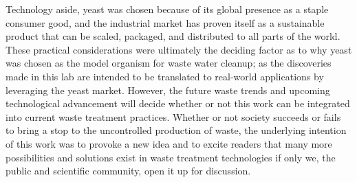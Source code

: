 \documentclass[../main/main]{subfiles}
\begin{document}
Technology aside, yeast was chosen because of its global presence as a staple consumer good, and the industrial market has proven itself as a sustainable product that can be scaled, packaged, and distributed to all parts of the world. These practical considerations were ultimately the deciding factor as to why yeast was chosen as the model organism for waste water cleanup; as the discoveries made in this lab are intended to be translated to real-world applications by leveraging the yeast market. However, the future waste trends and upcoming technological advancement will decide whether or not this work can be integrated into current waste treatment practices. Whether or not society succeeds or fails to bring a stop to the uncontrolled production of waste, the underlying intention of this work was to provoke a new idea and to excite readers that many more possibilities and solutions exist in waste treatment technologies if only we, the public and scientific community, open it up for discussion.

\printbibliography[title=References]
\end{document}
